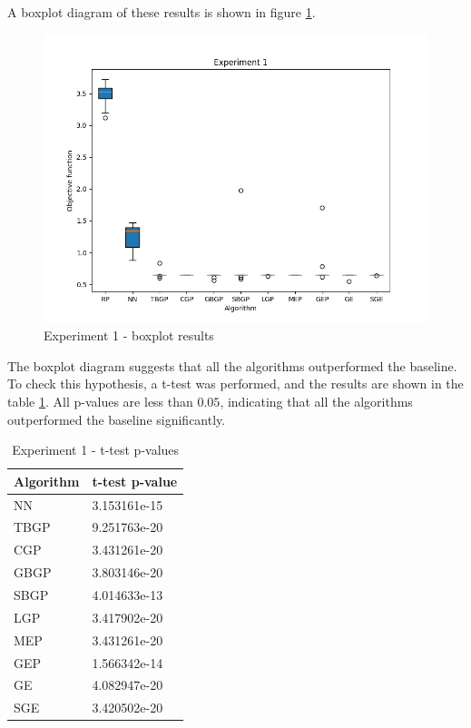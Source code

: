 A boxplot diagram of these results is shown in figure \ref{fig:experiment1}.

\begin{figure}[!htbp]
	\centering
	\includegraphics[scale=0.7]{../images/experiment1.png}
	\caption{Experiment 1 - boxplot results}
    \label{fig:experiment1}
\end{figure}

The boxplot diagram suggests that all the algorithms outperformed the baseline. To check this hypothesis, a t-test \citep{walpole} was performed, and the results are shown in the table \ref{tab:experiment1_stat}. All p-values are less than $0.05$, indicating that all the algorithms outperformed the baseline significantly.

\begin{table}[!htbp]
    \begin{center}
        \begin{tabular}{|l|l|} 
         \hline
            Algorithm & t-test p-value \\ [0.5ex] \hline\hline
            NN & 3.153161e-15 \\
            \hline
            TBGP & 9.251763e-20 \\
            \hline
            CGP & 3.431261e-20 \\
            \hline
            GBGP & 3.803146e-20 \\
            \hline
            SBGP & 4.014633e-13 \\
            \hline
            LGP & 3.417902e-20 \\
            \hline
            MEP & 3.431261e-20 \\
            \hline
            GEP & 1.566342e-14 \\
            \hline
            GE & 4.082947e-20 \\
            \hline
            SGE & 3.420502e-20 \\
            \hline
        \end{tabular}
    \end{center}
    \caption{Experiment 1 - t-test p-values}
\label{tab:experiment1_stat}
\end{table}

